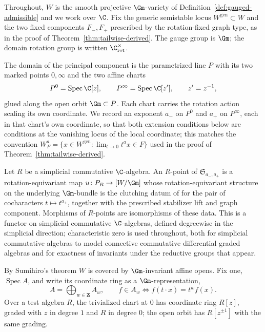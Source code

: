 Throughout, \(W\) is the smooth projective \(\Gm\)-variety of
Definition~\ref{def:gauged-admissible} and we work over \(\C\).  Fix the
generic semistable locus \(W^{\mathrm{gen}}\subset W\) and the two fixed
components \(F_-,F_+\) prescribed by the rotation-fixed graph type, as in the
proof of Theorem~\ref{thm:tailwise-derived}.  The gauge group is \(\Gm\); the
domain rotation group is written \(\C^\times_{\mathrm{rot}}\).

The domain of the principal component is the parametrized line \(P\) with its
two marked points \(0,\infty\) and the two affine charts
\[
 P^0=\operatorname{Spec}\C[z],\qquad
 P^\infty=\operatorname{Spec}\C[z'],\qquad z'=z^{-1},
\]
glued along the open orbit \(\Gm\subset P\).  Each chart carries the rotation
action scaling its own coordinate.  We record an exponent \(a_-\) on \(P^0\) and \(a_+\) on \(P^\infty\), each in
that chart's own coordinate, so that both extension conditions below are
conditions at the vanishing locus of the local coordinate; this matches the
convention \(W_F^a=\{x\in W^{\mathrm{gen}}:\lim_{t\to0}t^ax\in F\}\) used in
the proof of Theorem~\ref{thm:tailwise-derived}.

\begin{definition}
\label{def:app-fixed-section}
Let \(R\) be a simplicial commutative \(\C\)-algebra.  An \(R\)-point of
\(\mathfrak S_{a_-,a_+}\) is a rotation-equivariant map
\(u\colon P_R\to[W/\Gm]\) whose rotation-equivariant structure on the
underlying \(\Gm\)-bundle is the clutching datum of
\cite[Definition~9.7]{WoodwardQKIII} for the pair of cocharacters
\(t\mapsto t^{a_\pm}\), together with the prescribed stabilizer lift and graph
component.  Morphisms of \(R\)-points are isomorphisms of these data.  This is
a functor on simplicial commutative \(\C\)-algebras, defined degreewise in the
simplicial direction; characteristic zero is used throughout, both for
simplicial commutative algebras to model connective commutative differential
graded algebras and for exactness of invariants under the reductive groups that
appear.
\end{definition}

By Sumihiro's theorem \(W\) is covered by \(\Gm\)-invariant affine opens.  Fix
one, \(\operatorname{Spec}A\), and write its coordinate ring as a
\(\Gm\)-representation,
\begin{equation}\label{eq:app-grading}
 A=\bigoplus_{w\in\mathbf Z}A_w,
 \qquad
 f\in A_w\iff f(t\cdot x)=t^wf(x).
\end{equation}
Over a test algebra \(R\), the trivialized chart at \(0\) has coordinate ring
\(R[z]\), graded with \(z\) in degree \(1\) and \(R\) in degree \(0\); the open
orbit has \(R[z^{\pm1}]\) with the same grading.

